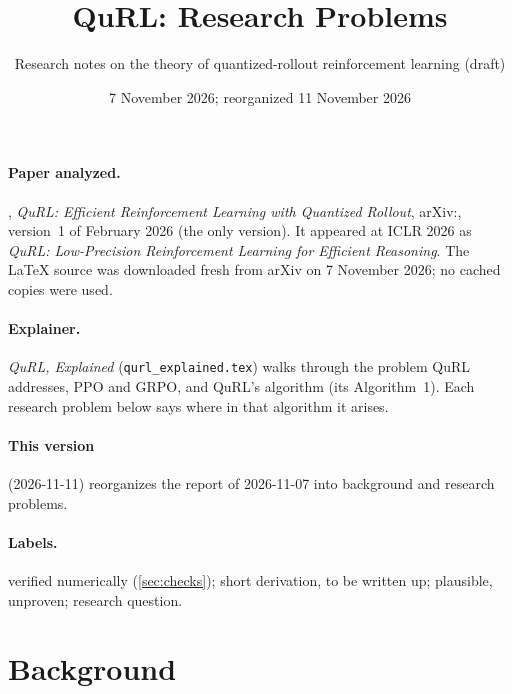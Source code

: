 \documentclass[11pt]{article}
\title{QuRL: Research Problems}
\author{Research notes on the theory of quantized-rollout reinforcement learning (draft)}
\date{7 November 2026; reorganized 11 November 2026}
\begin{document}
\maketitle

\paragraph{Paper analyzed.} \citet{li2026qurl}, \emph{QuRL: Efficient Reinforcement Learning with Quantized Rollout}, arXiv:, version~1 of February 2026 (the only version). It appeared at ICLR 2026 as \emph{QuRL: Low-Precision Reinforcement Learning for Efficient Reasoning}. The LaTeX source was downloaded fresh from arXiv on 7 November 2026; no cached copies were used.

\paragraph{Explainer.} \emph{QuRL, Explained} (\texttt{qurl\_explained.tex}) walks through the problem QuRL addresses, PPO and GRPO, and QuRL's algorithm (its Algorithm~1). Each research problem below says where in that algorithm it arises.

\paragraph{This version} (2026-11-11) reorganizes the report of 2026-11-07 into background and research problems.

\paragraph{Labels.} \tagchecked{} verified numerically (\cref{sec:checks}); \tagderived{} short derivation, to be written up; \tagconj{} plausible, unproven; \tagopen{} research question.

\tableofcontents

\section{Background}\label{sec:background}
\end{document}
